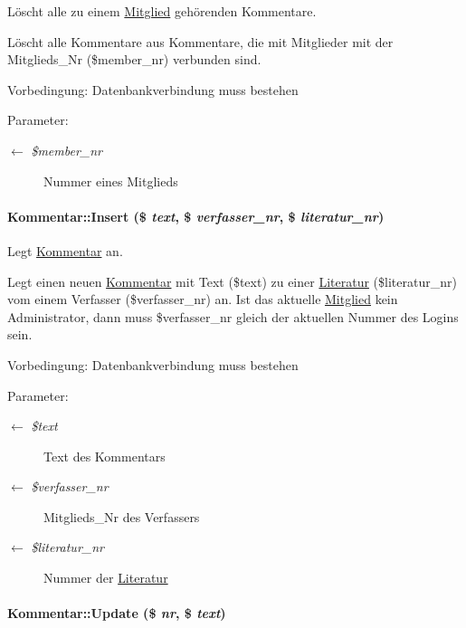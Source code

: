 Löscht alle zu einem \hyperlink{classMitglied}{Mitglied} gehörenden Kommentare. 

Löscht alle Kommentare aus Kommentare, die mit Mitglieder mit der Mitglieds\_\-Nr (\$member\_\-nr) verbunden sind. \begin{Desc}
\item[Vorbedingung:]Datenbankverbindung muss bestehen \end{Desc}
\begin{Desc}
\item[Parameter:]
\begin{description}
\item[\mbox{$\leftarrow$} {\em \$member\_\-nr}]Nummer eines Mitglieds \end{description}
\end{Desc}
\hypertarget{classKommentar_6119b3c12a61d8d5a41cded165517914}{
\paragraph[Insert]{\setlength{\rightskip}{0pt plus 5cm}Kommentar::Insert (\$ {\em text}, \$ {\em verfasser\_\-nr}, \$ {\em literatur\_\-nr})}\hfill}
\label{classKommentar_6119b3c12a61d8d5a41cded165517914}


Legt \hyperlink{classKommentar}{Kommentar} an. 

Legt einen neuen \hyperlink{classKommentar}{Kommentar} mit Text (\$text) zu einer \hyperlink{classLiteratur}{Literatur} (\$literatur\_\-nr) vom einem Verfasser (\$verfasser\_\-nr) an. Ist das aktuelle \hyperlink{classMitglied}{Mitglied} kein Administrator, dann muss \$verfasser\_\-nr gleich der aktuellen Nummer des Logins sein. \begin{Desc}
\item[Vorbedingung:]Datenbankverbindung muss bestehen \end{Desc}
\begin{Desc}
\item[Parameter:]
\begin{description}
\item[\mbox{$\leftarrow$} {\em \$text}]Text des Kommentars \item[\mbox{$\leftarrow$} {\em \$verfasser\_\-nr}]Mitglieds\_\-Nr des Verfassers \item[\mbox{$\leftarrow$} {\em \$literatur\_\-nr}]Nummer der \hyperlink{classLiteratur}{Literatur} \end{description}
\end{Desc}
\hypertarget{classKommentar_0b3e20e910493e67b67b747243f04511}{
\paragraph[Update]{\setlength{\rightskip}{0pt plus 5cm}Kommentar::Update (\$ {\em nr}, \$ {\em text})}\hfill}
\label{classKommentar_0b3e20e910493e67b67b747243f04511}


